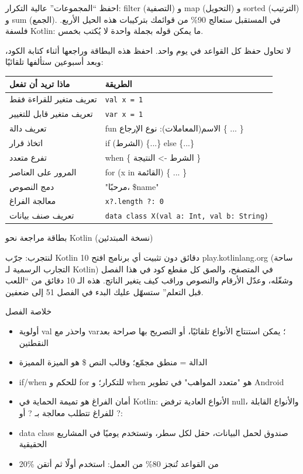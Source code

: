 احفظ “المجموعات” عالية التكرار: filter (التصفية) و map (التحويل) و sorted (الترتيب) و sum (الجمع). في المستقبل ستعالج 90\% من قوائمك بتركيبات هذه الحيل الأربع. فلسفة Kotlin: ما يمكن قوله بجملة واحدة لا يُكتب بخمس.


لا تحاول حفظ كل القواعد في يوم واحد. احفظ هذه البطاقة وراجعها أثناء كتابة الكود، وبعد أسبوعين ستألفها تلقائيًا:

\begin{center}
\begin{tabularx}{\linewidth}{|X|X|}
\hline
\textbf{ماذا تريد أن تفعل} & \textbf{الطريقة} \tabularnewline
\hline
تعريف متغير للقراءة فقط & \texttt{val x = 1} \tabularnewline
تعريف متغير قابل للتغيير & \texttt{var x = 1} \tabularnewline
تعريف دالة & fun الاسم(المعاملات): نوع الإرجاع \{ ... \} \tabularnewline
اتخاذ قرار & if (الشرط) \{...\} else \{...\} \tabularnewline
تفرع متعدد & when \{ الشرط -> النتيجة \} \tabularnewline
المرور على العناصر & for (x in القائمة) \{ ... \} \tabularnewline
دمج النصوص & "مرحبًا، \$name" \tabularnewline
معالجة الفراغ & \texttt{x?.\allowbreak length ?: 0} \tabularnewline
تعريف صنف بيانات & \texttt{data class X(val a: Int, val b: String)} \tabularnewline
\hline
\end{tabularx}
\end{center}

\begin{center}\small\color{gray}بطاقة مراجعة نحو Kotlin (نسخة المبتدئين)\end{center}

\begin{tcbpractice}{لنتجرب: جرّب Kotlin 10 دقائق دون تثبيت أي برنامج}
افتح play.kotlinlang.org (ساحة التجارب الرسمية لـ Kotlin) في المتصفح، والصق كل مقطع كود في هذا الفصل وشغّله، وعدّل الأرقام والنصوص وراقب كيف يتغير الناتج. هذه الـ 10 دقائق من “اللعب قبل التعلم” ستسهّل عليك البدء في الفصل 51 إلى ضعفين.

\end{tcbpractice}

\begin{tcbsummary}{خلاصة الفصل}
\begin{itemize}
  \item أولوية val واحذر مع var؛ يمكن استنتاج الأنواع تلقائيًا، أو التصريح بها صراحة بعد النقطتين
  \item الدالة = منطق مجمّع؛ وقالب النص \$ هو الميزة المميزة
  \item if/when للحكم و for للتكرار؛ و when هو "متعدد المواهب" في تطوير Android
  \item أمان الفراغ هو تميمة الحماية في Kotlin: الأنواع العادية ترفض null، والأنواع القابلة للفراغ تتطلب معالجة بـ ? أو ?:
  \item data class صندوق لحمل البيانات، حقل لكل سطر، وتستخدم يوميًا في المشاريع الحقيقية
  \item 20\% من القواعد تُنجز 80\% من العمل: استخدم أولًا ثم أتقن
\end{itemize}

\end{tcbsummary}
